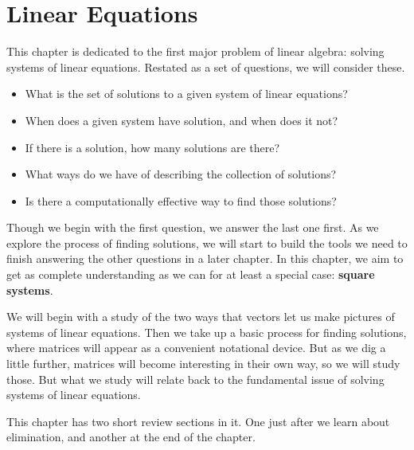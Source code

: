 \documentclass[10pt,]{book}
\newcommand{\terminology}[1]{\textbf{#1}}
\theoremstyle{plain}
\theoremstyle{definition}
\numberwithin{equation}{section}
\begin{document}
\clearpage
\typeout{************************************************}
\typeout{************************************************}
\chapter[Linear Equations]{Linear Equations}\label{chapter-2}

      This chapter is dedicated to the first major problem of
      linear algebra: solving systems of linear equations. Restated as a set of
      questions, we will consider these.
\begin{itemize}
\item{}
        What is the set of solutions to a given system of linear equations?
      \item{}
        When does a given system have solution, and when does it not?
      \item{}
        If there is a solution, how many solutions are there?
      \item{}
        What ways do we have of describing the collection of solutions?
      \item{}
        Is there a computationally effective way to find those solutions?
      \end{itemize}
\par

      Though we begin with the first question, we answer the last one first. As
      we explore the process of finding solutions, we will start to build the
      tools we need to finish answering the other questions in a later chapter.
      In this chapter, we aim to get as complete understanding as we can for at
      least a special case: \terminology{square systems}.
\par

      We will begin with a study of the two ways that vectors let us make pictures
      of systems of linear equations. Then we take up a basic process for finding
      solutions, where matrices will appear as a convenient notational device.
      But as we dig a little further, matrices will become interesting in their
      own way, so we will study those. But what we study will relate back to
      the fundamental issue of solving systems of linear equations.
\par

      This chapter has two short review sections in it. One just after we learn
      about elimination, and another at the end of the chapter.
\typeout{************************************************}
\typeout{************************************************}
\end{document}
